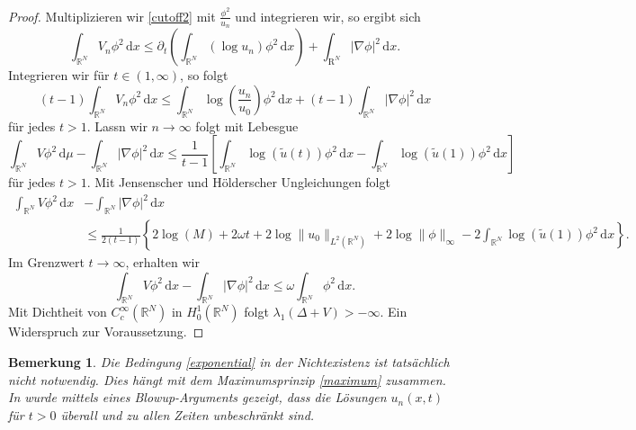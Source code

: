 \documentclass[11pt,twoside,a4paper]{article}
\theoremstyle{break}
\newtheorem{nt}[thm]{Bemerkung}
\begin{document}
\begin{proof}
Multiplizieren wir \eqref{cutoff2} mit $\frac{\phi^2}{u_n}$ und integrieren wir, so ergibt sich
\begin{equation}
\int_{\mathbb R^N} V_n \phi^2\, \mathrm dx \le \partial_t \left ( \int_{\mathbb R^N} (\log u_n) \phi^2\, \mathrm dx \right )+ \int_{\mathrm R^N} |\nabla \phi|^2\, \mathrm dx.
\end{equation}
Integrieren wir f\"ur $t\in (1,\infty)$, so folgt
\begin{equation}
(t-1) \int_{\mathbb R^N} V_n \phi^2\, \mathrm dx \le \int_{\mathbb R^N} \log \left ( \frac{u_n}{u_0} \right )\phi^2\, \mathrm dx + (t-1) \int_{\mathbb R^N}|\nabla \phi|^2\, \mathrm dx
\end{equation}
für jedes $t>1$. Lassn wir $n\to \infty$ folgt mit Lebesgue
\begin{equation}
\int_{\mathbb R^N} V\phi^2 \, \mathrm d\mu - \int_{\mathbb R^N} |\nabla \phi|^2 \, \mathrm dx \le \frac{1}{t-1} \left [ \int_{\mathbb R^N} \log(\tilde u(t)) \phi^2 \, \mathrm dx -\int_{\mathbb R^N} \log(\tilde u(1))\phi^2\, \mathrm dx \right ]
\end{equation}
für jedes $t>1$. Mit Jensenscher und Hölderscher Ungleichungen folgt
\begin{align*}
\int_{\mathbb R^N} V\phi^2 \, \mathrm dx &- \int_{\mathbb R^N} |\nabla \phi|^2\, \mathrm dx \\
 &\le  \frac{1}{2(t-1)} \left \{ 2\log(M) + 2\omega t + 2\log\|u_0\|_{L^2(\mathbb R^N)} + 2 \log \|\phi\|_\infty - 2\int_{\mathbb R^N} \log(\tilde u(1))\phi^2\, \mathrm dx \right \}.
\end{align*}
Im Grenzwert $t\to \infty$, erhalten wir
\begin{equation}
\int_{\mathbb R^N} V\phi^2\, \mathrm dx - \int_{\mathbb R^N} |\nabla \phi|^2\, \mathrm dx \le \omega \int_{\mathbb R^N} \phi^2\, \mathrm dx.
\end{equation}
Mit Dichtheit von $C_c^\infty(\mathbb R^N)$ in $H_0^1(\mathbb R^N)$ folgt $\lambda_1(\Delta +V) >-\infty$. Ein Widerspruch zur Voraussetzung.
\end{proof}
\begin{nt}\label{bem}
Die Bedingung \eqref{exponential} in der Nichtexistenz ist tatsächlich nicht notwendig. Dies hängt mit dem Maximumsprinzip \eqref{maximum} zusammen. In \cite{baras-goldstein} wurde mittels eines Blowup-Arguments gezeigt, dass die Lösungen $u_n(x,t)$ für $t>0$ überall und zu allen Zeiten unbeschränkt sind.
\end{nt}
\end{document}
